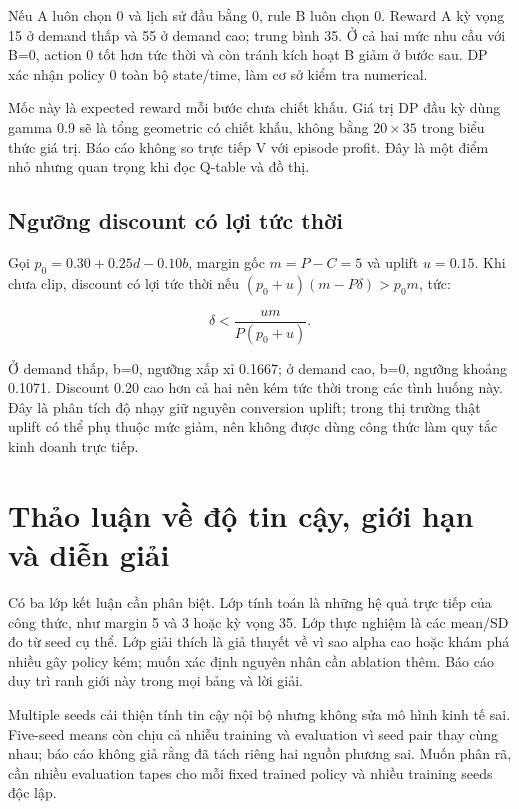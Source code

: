 Nếu A luôn chọn 0 và lịch sử đầu bằng 0, rule B luôn chọn 0. Reward A kỳ
vọng 15 ở demand thấp và 55 ở demand cao; trung bình 35. Ở cả hai mức
nhu cầu với B=0, action 0 tốt hơn tức thời và còn tránh kích hoạt B giảm
ở bước sau. DP xác nhận policy 0 toàn bộ state/time, làm cơ sở kiểm tra
numerical.

Mốc này là expected reward mỗi bước chưa chiết khấu. Giá trị DP đầu kỳ
dùng gamma 0.9 sẽ là tổng geometric có chiết khấu, không bằng
\(20\times35\) trong biểu thức giá trị. Báo cáo không so trực tiếp V với
episode profit. Đây là một điểm nhỏ nhưng quan trọng khi đọc Q-table và
đồ thị.

\subsection{Ngưỡng discount có lợi tức
thời}\label{ngux1b0ux1ee1ng-discount-cuxf3-lux1ee3i-tux1ee9c-thux1eddi}

Gọi \(p_0=0.30+0.25d-0.10b\), margin gốc \(m=P-C=5\) và uplift
\(u=0.15\). Khi chưa clip, discount có lợi tức thời nếu
\((p_0+u)(m-P\delta)>p_0m\), tức:

\[\delta<\frac{um}{P(p_0+u)}.\]

Ở demand thấp, b=0, ngưỡng xấp xỉ 0.1667; ở demand cao, b=0, ngưỡng
khoảng 0.1071. Discount 0.20 cao hơn cả hai nên kém tức thời trong các
tình huống này. Đây là phân tích độ nhạy giữ nguyên conversion uplift;
trong thị trường thật uplift có thể phụ thuộc mức giảm, nên không được
dùng công thức làm quy tắc kinh doanh trực tiếp.

\section{Thảo luận về độ tin cậy, giới hạn và diễn
giải}\label{thux1ea3o-luux1eadn-vux1ec1-ux111ux1ed9-tin-cux1eady-giux1edbi-hux1ea1n-vuxe0-diux1ec5n-giux1ea3i}

Có ba lớp kết luận cần phân biệt. Lớp tính toán là những hệ quả trực
tiếp của công thức, như margin 5 và 3 hoặc kỳ vọng 35. Lớp thực nghiệm
là các mean/SD đo từ seed cụ thể. Lớp giải thích là giả thuyết về vì sao
alpha cao hoặc khám phá nhiều gây policy kém; muốn xác định nguyên nhân
cần ablation thêm. Báo cáo duy trì ranh giới này trong mọi bảng và lời
giải.

Multiple seeds cải thiện tính tin cậy nội bộ nhưng không sửa mô hình
kinh tế sai. Five-seed means còn chịu cả nhiễu training và evaluation vì
seed pair thay cùng nhau; báo cáo không giả rằng đã tách riêng hai nguồn
phương sai. Muốn phân rã, cần nhiều evaluation tapes cho mỗi fixed
trained policy và nhiều training seeds độc lập.


